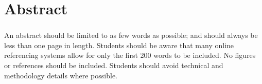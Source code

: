 \chapter*{Abstract} 
\subsection*{\thesistitle}

An abstract should be limited to as few words as possible; and should always be less than one page in length.  Students should be aware that many online referencing systems allow for only the first 200 words to be included.  No figures or references should be included.  Students should avoid technical and methodology details where possible.